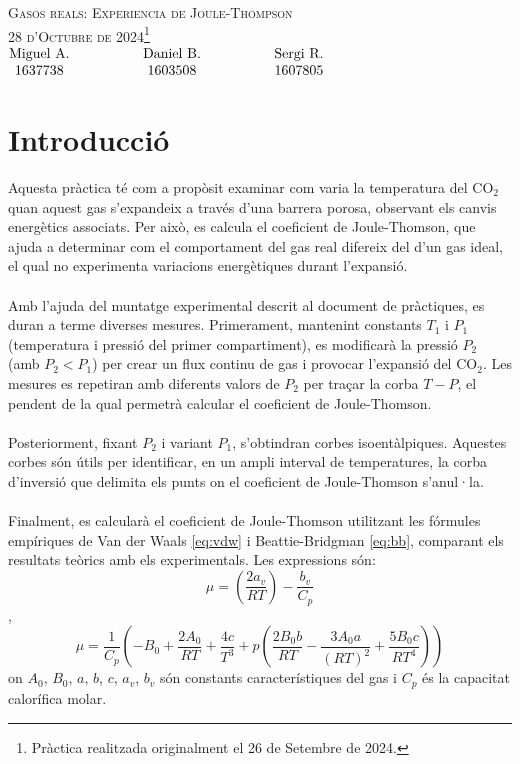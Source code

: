 \documentclass[12pt,twosides,onecolumn,openany]{article}
\begin{document}
\begin{center}
    {\Large \textsc{Gasos reals: 
    Experiencia de Joule-Thompson}}\\
    \vspace{0.2cm}
    \textsc{28 d'Octubre de 2024\footnote{Pràctica realitzada originalment el 26 de Setembre de 2024.}}\\
    \vspace{0.2cm}
    \(\begin{matrix} 
    \text{Miguel A.} \hspace{1.5cm} & \text{Daniel B.} & \hspace{1.5cm} \text{Sergi R.}\\
    1637738 \hspace{1.5cm} & 1603508 & \hspace{1.5cm} 1607805
    \end{matrix}
    \)
\end{center}
\section{Introducció}
Aquesta pràctica té com a propòsit examinar com varia la temperatura del CO$_2$ quan aquest gas s'expandeix a través d'una barrera porosa, observant els canvis energètics associats. Per això, es calcula el coeficient de Joule-Thomson, que ajuda a determinar com el comportament del gas real difereix del d'un gas ideal, el qual no experimenta variacions energètiques durant l'expansió.\\\\
Amb l'ajuda del muntatge experimental descrit al document de pràctiques, es duran a terme diverses mesures. Primerament, mantenint constants $T_1$ i $P_1$ (temperatura i pressió del primer compartiment), es modificarà la pressió $P_2$ (amb $P_2 < P_1$) per crear un flux continu de gas i provocar l'expansió del CO$_2$. Les mesures es repetiran amb diferents valors de $P_2$ per traçar la corba $T-P$, el pendent de la qual permetrà calcular el coeficient de Joule-Thomson.\\\\
Posteriorment, fixant $P_2$ i variant $P_1$, s'obtindran corbes isoentàlpiques. Aquestes corbes són útils per identificar, en un ampli interval de temperatures, la corba d'inversió que delimita els punts on el coeficient de Joule-Thomson s'anul·la.\\\\
Finalment, es calcularà el coeficient de Joule-Thomson utilitzant les fórmules empíriques de Van der Waals \eqref{eq:vdw} i Beattie-Bridgman \eqref{eq:bb}, comparant els resultats teòrics amb els experimentals. Les expressions són:
\begin{equation}\label{eq:vdw}
\mu = \left( \frac{2a_v}{RT} \right) - \frac{b_v}{C_p}
\end{equation}
,
\begin{equation}\label{eq:bb}
\mu = \frac{1}{C_p} \left( -B_0 + \frac{2A_0}{RT} + \frac{4c}{T^3} + p \left( \frac{2B_0b}{RT} - \frac{3A_0a}{(RT)^2} + \frac{5B_0c}{RT^4} \right) \right)
\end{equation}
on $A_0$, $B_0$, $a$, $b$, $c$, $a_v$, $b_v$ són constants característiques del gas i $C_p$ és la capacitat calorífica molar.
\end{document}

